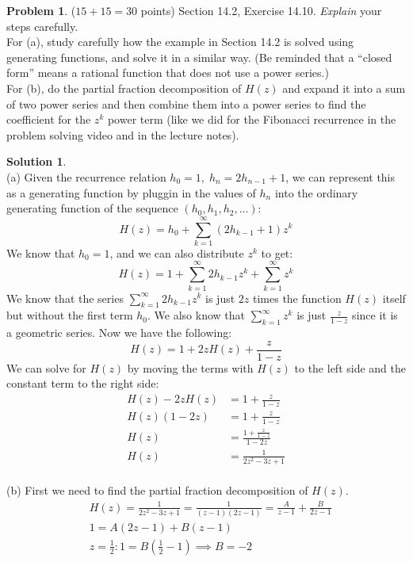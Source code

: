 \documentclass{article}
\theoremstyle{definition}
\newtheorem{problem}{Problem}
\newtheorem*{solution}{Solution}
\begin{document}
\newpage
\begin{problem} ($15+15=30$ points) Section 14.2, Exercise 14.10.
\textit{Explain} your steps carefully.\\[.5ex]
For (a), study carefully how the example in Section 14.2 is solved using generating 
functions, and solve it in a similar way. (Be reminded that a ``closed form'' means a 
rational function that does not use a power series.)\\[.5ex]
For (b), do the partial fraction decomposition of $H(z)$ and expand it into a sum of 
two power series and then combine them into a power series to find the coefficient 
for the $z^k$ power term (like we did for the Fibonacci recurrence in the problem 
solving video and in the lecture notes). 
\end{problem}
\begin{solution}
\ \\
(a) Given the recurrence relation $h_0 = 1, \; h_n = 2h_{n-1} + 1$, we can represent this as a generating function
by pluggin in the values of $h_n$ into the ordinary generating function of the sequence $(h_0, h_1, h_2, ...)$:
$$ H(z) = h_0 + \sum_{k=1}^{\infty} (2h_{k-1} + 1) z^k $$
We know that $h_0 = 1$, and we can also distribute $z^k$ to get:
$$ H(z) = 1 + \sum_{k=1}^{\infty} 2h_{k-1}z^k + \sum_{k=1}^{\infty} z^k $$
We know that the series $\sum_{k=1}^{\infty} 2h_{k-1}z^k$ is just $2z$ times the function $H(z)$ itself but without the first term $h_0$.
We also know that $\sum_{k=1}^{\infty} z^k$ is just $\frac{z}{1 - z}$ since it is a geometric series.
Now we have the following:
$$ H(z) = 1 + 2zH(z) + \frac{z}{1 - z} $$
We can solve for $H(z)$ by moving the terms with $H(z)$ to the left side and the constant term to the right side:
\begin{align*}
H(z) - 2zH(z) &= 1 + \frac{z}{1 - z} \\
H(z)(1 - 2z) &= 1 + \frac{z}{1 - z} \\
H(z) &= \frac{1 + \frac{z}{1 - z}}{1 - 2z} \\
H(z) &= \frac{1}{2z^2 - 3z + 1}
\end{align*}
\ \\
(b) First we need to find the partial fraction decomposition of $H(z)$.
\begin{align*}
&H(z) = \frac{1}{2z^2 - 3z + 1} = \frac{1}{(z - 1)(2z - 1)} = \frac{A}{z - 1} + \frac{B}{2z - 1} \\
&1 = A(2z - 1) + B(z - 1) \\
&z = \frac{1}{2}: 1 = B(\frac{1}{2} - 1) \implies B = -2 \\

\end{align*}
\end{solution}
\end{document}
